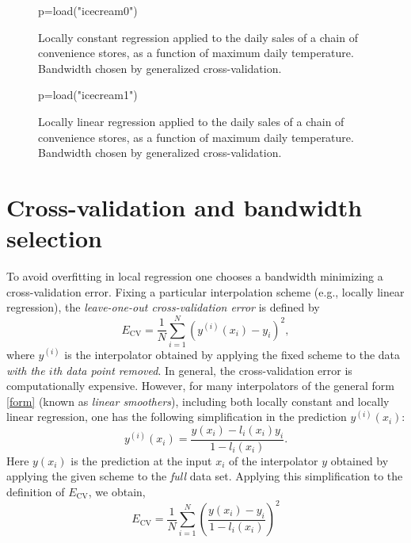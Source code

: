 \documentclass[11pt, reqno]{amsart}
\newcommand\df{\em}
\begin{document}
\begin{figure}
  \begin{sagesilent}
     p=load("icecream0")
  \end{sagesilent}
  \centering 
  \caption{Locally constant regression applied to the daily sales of a
    chain of convenience stores, as a function of
    maximum daily temperature. Bandwidth chosen by generalized cross-validation.}
\end{figure}

\begin{figure}
  \begin{sagesilent}
     p=load("icecream1")
  \end{sagesilent}
  \centering 
  \caption{Locally linear regression applied to the daily sales of a
    chain of convenience stores, as a function of maximum daily
    temperature. Bandwidth chosen by generalized cross-validation.}
\end{figure}


\section{Cross-validation and bandwidth selection}\label{cross}
To avoid overfitting in local regression one chooses a bandwidth
minimizing a cross-validation error. Fixing a particular interpolation
scheme (e.g., locally linear regression), the {\df leave-one-out
cross-validation error} is defined by
\begin{equation*}
  E_\text{CV}= \frac{1}{N}\sum_{i=1}^N(y^{(i)}(x_i)-y_i)^2,
\end{equation*}
where $y^{(i)}$ is the interpolator obtained by applying the fixed
scheme to the data {\em with the $i$th data point removed}. In
general, the cross-validation error is computationally expensive.
However, for many interpolators of the general form \eqref{form} (known
as {\em linear smoothers}),
including  both locally constant and locally linear regression, one
has the following simplification in the prediction $y^{(i)}(x_i)$:
\begin{equation*}
  y^{(i)}(x_i)=\frac{y(x_i)-l_i(x_i)y_i}{1-l_i(x_i)}.
\end{equation*}
Here $y(x_i)$ is the prediction at the input $x_i$ of the interpolator
$y$ obtained by applying the given scheme to the {\em full} data
set. Applying this simplification to the definition of $E_\text{CV}$,
we obtain,
\begin{equation}
  E_\text{CV}=\frac{1}{N}\sum_{i=1}^N\left(\frac{y(x_i)-y_i}{1-l_i(x_i)}\right)^2\label{it}
\end{equation}
\end{document}
